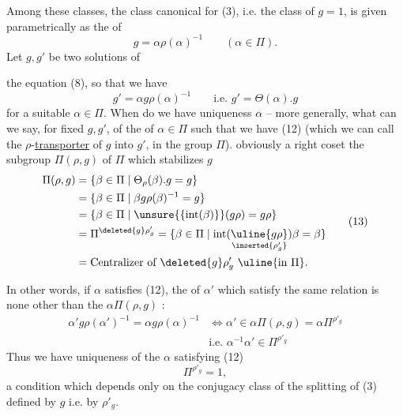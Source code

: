 Among these classes, the  class  canonical for (3), i.e. the class of $g=1$, is given parametrically  as the  of
\[
g=\alpha\rho(\alpha)^{-1}\qquad(\alpha\in\Pi). \tag{11}
\]
Let $g,g'$ be two  solutions of


the equation (8), so that we have
\[
g'=\alpha g\rho(\alpha)^{-1}\qquad\text{i.e. }g'=\Theta(\alpha).g \tag{12}
\]
for a suitable $\alpha\in\Pi$. When do we have uniqueness  $\alpha$ -- more generally, what can we say, for fixed $g,g'$, of the  of $\alpha\in\Pi$  such that we have (12) (which we can call the $\rho$-\uline{transporter} of $g$ into $g'$, in the group $\Pi$).  obviously a right coset  the subgroup $\Pi(\rho,g)$ of $\Pi$ which  stabilizes $g$
\[
\begin{aligned}
\Pi(\rho,g)&=\{\beta\in\Pi\mid\Theta_\rho(\beta).g=g\}\\
&=\{\beta\in\Pi\mid\beta g\rho(\beta)^{-1}=g\}\\
&=\{\beta\in\Pi\mid\unsure{\{\mathrm{int}(\beta)\}}(g\rho)=g\rho\}\\
&=\Pi^{\deleted{g}\rho'_g}=\{\beta\in\Pi\mid\mathrm{int}(\underset{\inserted{\rho'_g}}{\uline{g\rho}})\beta=\beta\}\\
&=\text{Centralizer of }\deleted{g}\rho'_g\ \uline{\text{in }\Pi}.
\end{aligned}\tag{13}
\]

In other words, if $\alpha$ satisfies (12), the  of $\alpha'$ which satisfy the same relation is none other than the  $\alpha\Pi(\rho,g)$ :
\[
\begin{aligned}
\alpha'g\rho(\alpha')^{-1}=\alpha g\rho(\alpha)^{-1}
&\Longleftrightarrow\alpha'\in\alpha\Pi(\rho,g)=\alpha\Pi^{\rho'_g}\\
&\text{i.e. }\alpha^{-1}\alpha'\in\Pi^{\rho'_g}
\end{aligned}\tag{14}
\]
Thus we have uniqueness of the $\alpha$ satisfying (12)  
\[
\Pi^{\rho'_g}=1, \tag{15}
\]
a condition which depends only on the conjugacy class of the splitting  of (3) defined by $g$ i.e. by $\rho'_g$.


